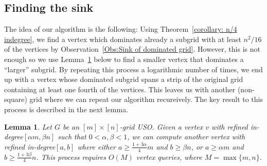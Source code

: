 \documentclass[a4paper,10pt]{article}
\newtheorem{lemma}{Lemma}
\newcommand{\indegree}{refined in-degree\xspace}
\begin{document}
\subsection{Finding the sink}
The idea of our algorithm is the following: Using Theorem~\ref{corollary: n/4 indegree}, we find a vertex which dominates already a subgrid with at least $n^2/16$ of the vertices  by Observation~\ref{Obs:Sink of dominated grid}. However, this is not enough so we use Lemma~\ref{lemma:Constant fraction improvement} below to find a smaller vertex that dominates a ``larger'' subgrid. By repeating this process a logarithmic number of times, we end up with a vertex whose dominated subgrid spans a strip of the original grid containing at least one fourth of the vertices. This leaves us with another (non-square) grid where we can repeat our algorithm recureively. The key result to this process is described in the next lemma.


\begin{lemma}\label{lemma:Constant fraction improvement}
Let $G$ be an $[m]\times[n]$-grid USO. 
Given a vertex $v$ with \indegree $[\alpha m, \beta n]$ such that $0 < \alpha, \beta < 1$, we can compute another vertex with \indegree $[a,b]$ where either $a\geq \frac{1+3\alpha}{4}m$ and $b \geq \beta n$, or $a \geq \alpha m$ and $b \geq \frac{1 + 3\beta}{4}n$. This process requires $O(M)$ vertex queries, where $M = \max\{m,n\}$.
\end{lemma}
\end{document}
